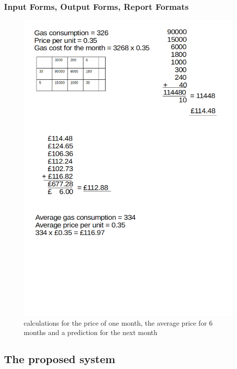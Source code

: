 \subsubsection{Input Forms, Output Forms, Report Formats}
\begin{figure}[H]
    \includegraphics[width=\textwidth]{./maths.png}
    \caption{calculations for the price of one month, the average price for 6 months and a prediction for the next month} \label{fig:calculations}
\end{figure}
\subsection{The proposed system}

